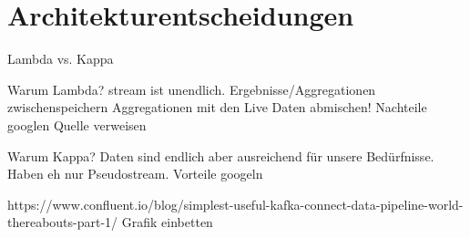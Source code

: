 \section{Architekturentscheidungen}

Lambda vs. Kappa

Warum Lambda?
stream ist unendlich. Ergebnisse/Aggregationen zwischenspeichern
Aggregationen mit den Live Daten abmischen!
Nachteile googlen
Quelle verweisen

Warum Kappa?
Daten sind endlich aber ausreichend für unsere Bedürfnisse.
Haben eh nur Pseudostream.
Vorteile googeln

https://www.confluent.io/blog/simplest-useful-kafka-connect-data-pipeline-world-thereabouts-part-1/
Grafik einbetten
